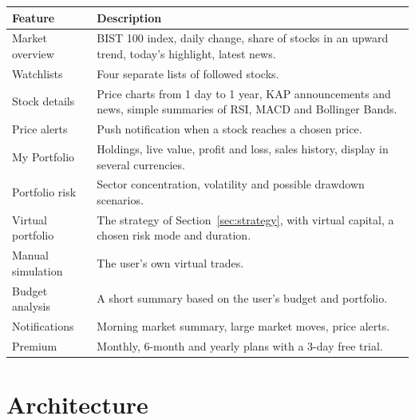 \documentclass[a4paper,11pt]{article}
\begin{document}
\begin{tabularx}{\linewidth}{@{}lX@{}}
\toprule
\textbf{Feature} & \textbf{Description} \\
\midrule
Market overview & BIST 100 index, daily change, share of stocks in an upward trend, today's highlight, latest news. \\
Watchlists & Four separate lists of followed stocks. \\
Stock details & Price charts from 1 day to 1 year, KAP announcements and news, simple summaries of RSI, MACD and Bollinger Bands. \\
Price alerts & Push notification when a stock reaches a chosen price. \\
My Portfolio & Holdings, live value, profit and loss, sales history, display in several currencies. \\
Portfolio risk & Sector concentration, volatility and possible drawdown scenarios. \\
Virtual portfolio & The strategy of Section~\ref{sec:strategy}, with virtual capital, a chosen risk mode and duration. \\
Manual simulation & The user's own virtual trades. \\
Budget analysis & A short summary based on the user's budget and portfolio. \\
Notifications & Morning market summary, large market moves, price alerts. \\
Premium & Monthly, 6-month and yearly plans with a 3-day free trial. \\
\bottomrule
\end{tabularx}

\section{Architecture}
\end{document}
